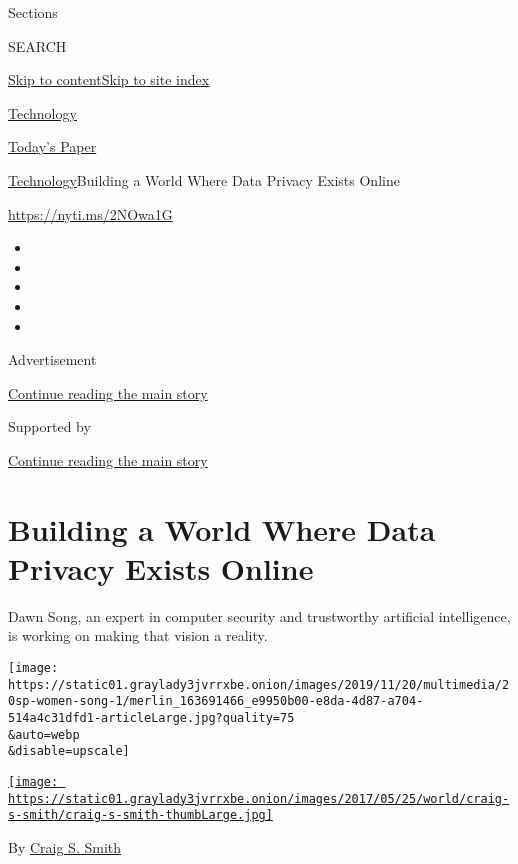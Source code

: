 Sections

SEARCH

\protect\hyperlink{site-content}{Skip to
content}\protect\hyperlink{site-index}{Skip to site index}

\href{https://www.nytimes3xbfgragh.onion/section/technology}{Technology}

\href{https://myaccount.nytimes3xbfgragh.onion/auth/login?response_type=cookie\&client_id=vi}{}

\href{https://www.nytimes3xbfgragh.onion/section/todayspaper}{Today's
Paper}

\href{/section/technology}{Technology}\textbar{}Building a World Where
Data Privacy Exists Online

\url{https://nyti.ms/2NOwa1G}

\begin{itemize}
\item
\item
\item
\item
\item
\end{itemize}

Advertisement

\protect\hyperlink{after-top}{Continue reading the main story}

Supported by

\protect\hyperlink{after-sponsor}{Continue reading the main story}

\hypertarget{building-a-world-where-data-privacy-exists-online}{%
\section{Building a World Where Data Privacy Exists
Online}\label{building-a-world-where-data-privacy-exists-online}}

Dawn Song, an expert in computer security and trustworthy artificial
intelligence, is working on making that vision a reality.

\texttt{[image: https://static01.graylady3jvrrxbe.onion/images/2019/11/20/multimedia/20sp-women-song-1/merlin\_163691466\_e9950b00-e8da-4d87-a704-514a4c31dfd1-articleLarge.jpg?quality=75\\\&auto=webp\\\&disable=upscale]}

\href{https://www.nytimes3xbfgragh.onion/by/craig-s-smith}{\texttt{[image: https://static01.graylady3jvrrxbe.onion/images/2017/05/25/world/craig-s-smith/craig-s-smith-thumbLarge.jpg]}}

By \href{https://www.nytimes3xbfgragh.onion/by/craig-s-smith}{Craig S.
Smith}

